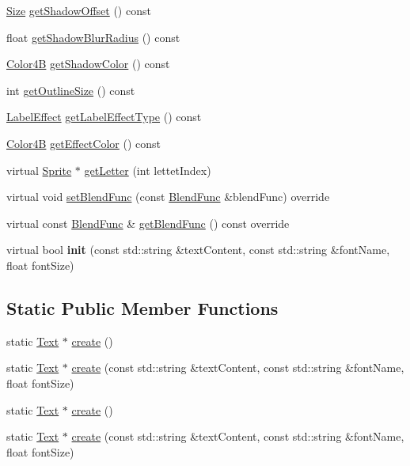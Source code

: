 \begin{DoxyCompactItemize}
\item 
\hyperlink{classSize}{Size} \hyperlink{classui_1_1Text_ae54b6b1e10f9faed2f90f22f93583afa}{get\+Shadow\+Offset} () const
\item 
float \hyperlink{classui_1_1Text_af78e7c5927071915480df8d780a2c071}{get\+Shadow\+Blur\+Radius} () const
\item 
\hyperlink{structColor4B}{Color4B} \hyperlink{classui_1_1Text_a9db20ba9bf8aca14d1af3d4ab479378d}{get\+Shadow\+Color} () const
\item 
int \hyperlink{classui_1_1Text_aa66f027d1a211fc1ee6cba3650ed8166}{get\+Outline\+Size} () const
\item 
\hyperlink{group__base_ga26fd049ca5303e0cf4435208058f32e4}{Label\+Effect} \hyperlink{classui_1_1Text_a8befc76f2ea28668b29e1ba0c6ee6793}{get\+Label\+Effect\+Type} () const
\item 
\hyperlink{structColor4B}{Color4B} \hyperlink{classui_1_1Text_aa9fd5963e5d30257d9f2558d90cbd5e8}{get\+Effect\+Color} () const
\item 
virtual \hyperlink{classSprite}{Sprite} $\ast$ \hyperlink{classui_1_1Text_ae4acdfb8c24dfbd9ebfaf0b9d9d0a00c}{get\+Letter} (int lettet\+Index)
\item 
virtual void \hyperlink{classui_1_1Text_a68bf2951330099b3a45605e9c391a437}{set\+Blend\+Func} (const \hyperlink{structBlendFunc}{Blend\+Func} \&blend\+Func) override
\item 
virtual const \hyperlink{structBlendFunc}{Blend\+Func} \& \hyperlink{classui_1_1Text_a141bd9005aaf4cf0479502e185ced570}{get\+Blend\+Func} () const override
\item 
\mbox{\label{classui_1_1Text_adc07a100776d98ca67d5e57a5f34e74d}} 
virtual bool {\bfseries init} (const std\+::string \&text\+Content, const std\+::string \&font\+Name, float font\+Size)
\end{DoxyCompactItemize}
\subsection*{Static Public Member Functions}
\begin{DoxyCompactItemize}
\item 
static \hyperlink{classui_1_1Text}{Text} $\ast$ \hyperlink{classui_1_1Text_aafdd02d8f0b256cb4997ada4f146e2c2}{create} ()
\item 
static \hyperlink{classui_1_1Text}{Text} $\ast$ \hyperlink{classui_1_1Text_a838f46893abea1084c823a8277f701d7}{create} (const std\+::string \&text\+Content, const std\+::string \&font\+Name, float font\+Size)
\item 
static \hyperlink{classui_1_1Text}{Text} $\ast$ \hyperlink{classui_1_1Text_a286a19300b05c8fcd35e1fcbb80b8ab9}{create} ()
\item 
static \hyperlink{classui_1_1Text}{Text} $\ast$ \hyperlink{classui_1_1Text_a844ecf16eac4f8b504d3ed3661f72945}{create} (const std\+::string \&text\+Content, const std\+::string \&font\+Name, float font\+Size)
\end{DoxyCompactItemize}
